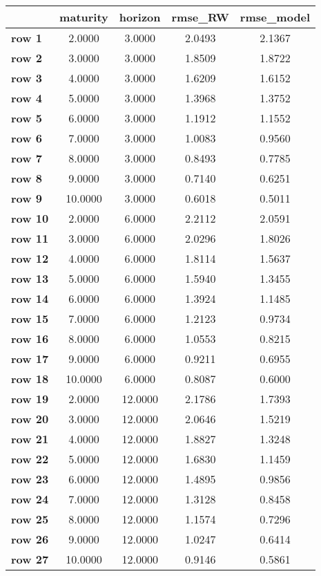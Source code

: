 \begin{tiny}\begin{tabular}{|l|c|c|c|c|}
\hline
&\textbf{maturity}&\textbf{horizon}&\textbf{rmse_RW}&\textbf{rmse_model}\\\hline
\textbf{row 1}&2.0000&3.0000&2.0493&2.1367\\\hline
\textbf{row 2}&3.0000&3.0000&1.8509&1.8722\\\hline
\textbf{row 3}&4.0000&3.0000&1.6209&1.6152\\\hline
\textbf{row 4}&5.0000&3.0000&1.3968&1.3752\\\hline
\textbf{row 5}&6.0000&3.0000&1.1912&1.1552\\\hline
\textbf{row 6}&7.0000&3.0000&1.0083&0.9560\\\hline
\textbf{row 7}&8.0000&3.0000&0.8493&0.7785\\\hline
\textbf{row 8}&9.0000&3.0000&0.7140&0.6251\\\hline
\textbf{row 9}&10.0000&3.0000&0.6018&0.5011\\\hline
\textbf{row 10}&2.0000&6.0000&2.2112&2.0591\\\hline
\textbf{row 11}&3.0000&6.0000&2.0296&1.8026\\\hline
\textbf{row 12}&4.0000&6.0000&1.8114&1.5637\\\hline
\textbf{row 13}&5.0000&6.0000&1.5940&1.3455\\\hline
\textbf{row 14}&6.0000&6.0000&1.3924&1.1485\\\hline
\textbf{row 15}&7.0000&6.0000&1.2123&0.9734\\\hline
\textbf{row 16}&8.0000&6.0000&1.0553&0.8215\\\hline
\textbf{row 17}&9.0000&6.0000&0.9211&0.6955\\\hline
\textbf{row 18}&10.0000&6.0000&0.8087&0.6000\\\hline
\textbf{row 19}&2.0000&12.0000&2.1786&1.7393\\\hline
\textbf{row 20}&3.0000&12.0000&2.0646&1.5219\\\hline
\textbf{row 21}&4.0000&12.0000&1.8827&1.3248\\\hline
\textbf{row 22}&5.0000&12.0000&1.6830&1.1459\\\hline
\textbf{row 23}&6.0000&12.0000&1.4895&0.9856\\\hline
\textbf{row 24}&7.0000&12.0000&1.3128&0.8458\\\hline
\textbf{row 25}&8.0000&12.0000&1.1574&0.7296\\\hline
\textbf{row 26}&9.0000&12.0000&1.0247&0.6414\\\hline
\textbf{row 27}&10.0000&12.0000&0.9146&0.5861\\\hline
\end{tabular}
\end{tiny}